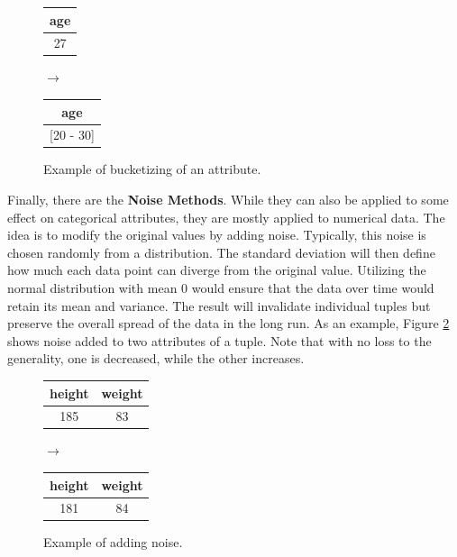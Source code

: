 \begin{figure}[ht]
    \begin{center}
    \footnotesize{
        \renewcommand{\arraystretch}{1.5}
        \begin{tabular}{|c|}
            \hline
            age \\
            \hline
            27 \\
            \hline
            \end{tabular}
            \quad $\longrightarrow$ \quad
            \begin{tabular}{|c|}
            \hline
            age \\
            \hline
            {[20 - 30]} \\
            \hline
        \end{tabular}
    }
    \end{center}
    \caption{Example of bucketizing of an attribute.\label{fig:bucketizing}}
\end{figure}

Finally, there are the \textbf{Noise Methods}. While they can also be applied to some effect on categorical attributes, they are mostly applied to numerical data. The idea is to modify the original values by adding noise. Typically, this noise is chosen randomly from a distribution. The standard deviation will then define how much each data point can diverge from the original value. Utilizing the normal distribution with mean $0$ would ensure that the data over time would retain its mean and variance. The result will invalidate individual tuples but preserve the overall spread of the data in the long run. As an example, Figure \ref{fig:noise} shows noise added to two attributes of a tuple. Note that with no loss to the generality, one is decreased, while the other increases. 

\bigskip

\begin{figure}[ht]
    \begin{center}
    \footnotesize{
        \renewcommand{\arraystretch}{1.5}
        \begin{tabular}{|c|c|}
            \hline
            height & weight \\
            \hline
            185 & 83 \\
            \hline
            \end{tabular}
            \quad $\longrightarrow$ \quad
            \begin{tabular}{|c|c|}
            \hline
            height & weight  \\
            \hline
            181 & 84\\
            \hline
        \end{tabular}
    }
    \end{center}
    \caption{Example of adding noise.\label{fig:noise}}
\end{figure}

